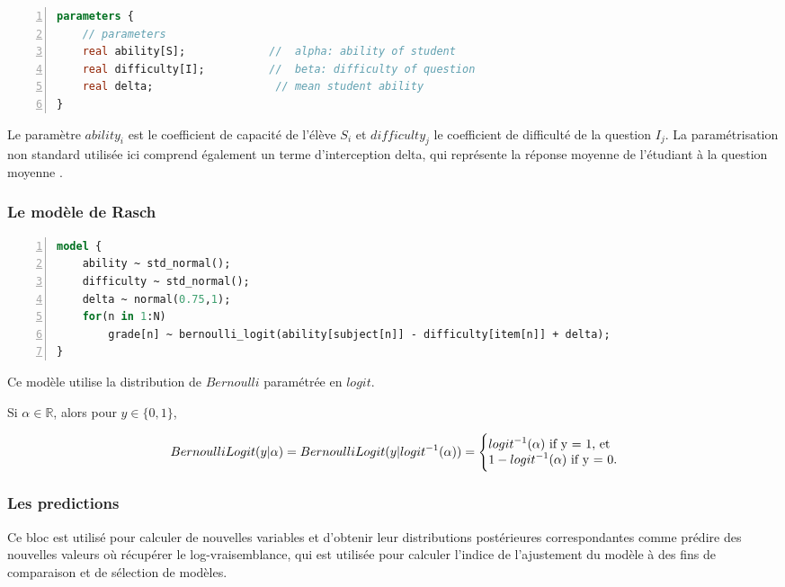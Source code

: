 \begin{lstlisting}[language=Stan,basicstyle=\scriptsize, frame=l,framesep=4.5mm,framexleftmargin=2.5mm,tabsize=2,numbers=left,fillcolor=\color{blueforest!70},rulecolor=\color{blueforest},numberstyle=\normalfont\tiny\color{white}]
parameters {
	// parameters
	real ability[S];             //  alpha: ability of student
	real difficulty[I];          //  beta: difficulty of question
	real delta;                   // mean student ability
}
\end{lstlisting}
Le paramètre  \(\displaystyle ability_{i} \) est le coefficient de capacité de l'élève \(\displaystyle S_{i} \) et \(\displaystyle difficulty_{j} \) le coefficient de difficulté de la question \(\displaystyle I_{j} \). La paramétrisation non standard utilisée ici comprend également un terme d'interception delta, qui représente la réponse moyenne de l'étudiant à la question moyenne \cite{data_analysis_irt}.

\subsubsection{Le modèle de Rasch}

\begin{lstlisting}[language=Stan,basicstyle=\scriptsize, frame=l,framesep=4.5mm,framexleftmargin=2.5mm,tabsize=2,numbers=left,fillcolor=\color{blueforest!70},rulecolor=\color{blueforest},numberstyle=\normalfont\tiny\color{white}]
model {
	ability ~ std_normal();         
	difficulty ~ std_normal();   
	delta ~ normal(0.75,1);
	for(n in 1:N)
		grade[n] ~ bernoulli_logit(ability[subject[n]] - difficulty[item[n]] + delta);
}
\end{lstlisting}
Ce modèle utilise la distribution de \(\displaystyle Bernoulli \) paramétrée en  \(\displaystyle logit \).

Si \(\displaystyle \alpha \in \mathbb{R} \), alors pour \(\displaystyle y \in \{ 0,1 \} \), 

\begin{equation}
    BernoulliLogit(y|\alpha) = BernoulliLogit(y|logit^{-1} (\alpha)) = \Bigg \{ 
\begin{tabular}{@{}l@{}}
    \(\displaystyle logit^{-1} (\alpha)\)  if y = 1, et \\
    \(\displaystyle 1-logit^{-1}(\alpha) \)  if y = 0. 
\end{tabular}
\end{equation}


\subsubsection{Les predictions}
Ce bloc est utilisé pour calculer de nouvelles variables et d'obtenir leur distributions postérieures correspondantes comme prédire des nouvelles valeurs où récupérer le log-vraisemblance, qui est utilisée pour calculer l’indice de l'ajustement du modèle à des fins de comparaison et de sélection de modèles.

